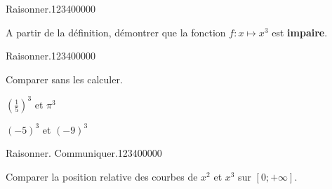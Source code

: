 \begin{pageAD}  %
\restoregeometry %
 

\begin{ExoCad}{Raisonner.}{1234}{0}{0}{0}{0}{0}

A partir de la définition, démontrer que la fonction $f:x\mapsto x^3$ est \textbf{impaire}.


%
%
%

\end{ExoCad} 

\begin{ExoCad}{Raisonner.}{1234}{0}{0}{0}{0}{0}

Comparer sans les calculer.

\begin{description}[leftmargin=*]
\item $\left(\frac{1}{5}\right)^3$ et $\pi^3$  

%


\item $(-5)^3$ et $(-9)^3$

%

\end{description}

\end{ExoCad} 


\begin{ExoCad}{Raisonner. Communiquer.}{1234}{0}{0}{0}{0}{0}

Comparer la position relative des courbes de $x^2$ et $x^3$ sur $[0;+\infty]$.


\end{ExoCad}
\end{pageAD}
